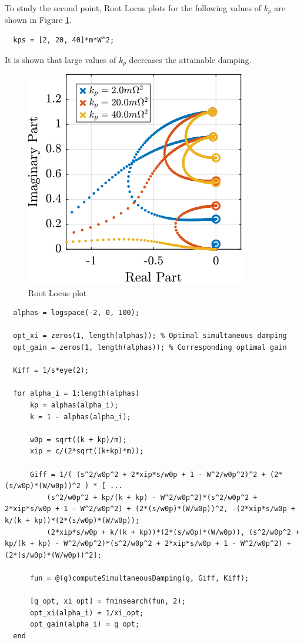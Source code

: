 \documentclass[a4paper, 10pt, DIV=12, parskip=full]{scrreprt}
\begin{document}
To study the second point, Root Locus plots for the following values of \(k_p\) are shown in Figure \ref{fig:root_locus_iff_kps}.
\begin{verbatim}
  kps = [2, 20, 40]*m*W^2;
\end{verbatim}

It is shown that large values of \(k_p\) decreases the attainable damping.
\begin{figure}[htbp]
\centering
\includegraphics[scale=1]{figs/root_locus_iff_kps.png}
\caption{\label{fig:root_locus_iff_kps}Root Locus plot}
\end{figure}

\begin{verbatim}
  alphas = logspace(-2, 0, 100);

  opt_xi = zeros(1, length(alphas)); % Optimal simultaneous damping
  opt_gain = zeros(1, length(alphas)); % Corresponding optimal gain

  Kiff = 1/s*eye(2);

  for alpha_i = 1:length(alphas)
      kp = alphas(alpha_i);
      k = 1 - alphas(alpha_i);

      w0p = sqrt((k + kp)/m);
      xip = c/(2*sqrt((k+kp)*m));

      Giff = 1/( (s^2/w0p^2 + 2*xip*s/w0p + 1 - W^2/w0p^2)^2 + (2*(s/w0p)*(W/w0p))^2 ) * [ ...
          (s^2/w0p^2 + kp/(k + kp) - W^2/w0p^2)*(s^2/w0p^2 + 2*xip*s/w0p + 1 - W^2/w0p^2) + (2*(s/w0p)*(W/w0p))^2, -(2*xip*s/w0p + k/(k + kp))*(2*(s/w0p)*(W/w0p));
          (2*xip*s/w0p + k/(k + kp))*(2*(s/w0p)*(W/w0p)), (s^2/w0p^2 + kp/(k + kp) - W^2/w0p^2)*(s^2/w0p^2 + 2*xip*s/w0p + 1 - W^2/w0p^2) + (2*(s/w0p)*(W/w0p))^2];

      fun = @(g)computeSimultaneousDamping(g, Giff, Kiff);

      [g_opt, xi_opt] = fminsearch(fun, 2);
      opt_xi(alpha_i) = 1/xi_opt;
      opt_gain(alpha_i) = g_opt;
  end
\end{verbatim}
\end{document}
